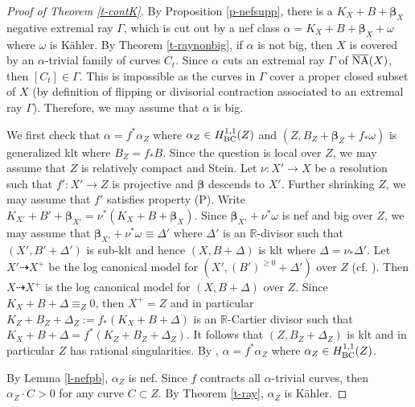 \documentclass[11pt]{amsart}
\numberwithin{equation}{section}
\def\bbeta{\boldsymbol{\beta}}
\newcommand\R{{\mathbb{R}}}
\theoremstyle{definition}
\theoremstyle{definition}
\theoremstyle{definition}
\begin{document}
    \begin{proof}[Proof of Theorem \ref{t-contK}] By Proposition \ref{p-nefsupp}, there is a $K_X+B+\bbeta _X$ negative extremal ray $\Gamma$, which is  cut out by a nef class $\alpha =K_X+B+\bbeta _X+\omega$ where $\omega $ is K\"ahler. By Theorem \ref{t-raynonbig}, if $\alpha$ is not big, then $X$ is covered by an $\alpha$-trivial family of curves $C_t$. Since $\alpha$ cuts an extremal ray $\Gamma$ of $\overline{\rm NA}(X)$, then $[C_t]\in \Gamma$. This is impossible as the curves in $\Gamma$ cover a proper closed subset of $X$ (by definition of flipping or divisorial contraction associated to an extremal ray $\Gamma$). Therefore,  we may assume that $\alpha$ is big. %
    

We first check that $\alpha =f^*\alpha _Z$ where $\alpha_Z\in H^{1,1}_{\rm BC}(Z)$ and $(Z,B_Z+\bbeta _Z+f_*\omega )$ is generalized klt where $B_Z=f_*B$. Since the question is local over $Z$, we may assume that $Z$ is relatively compact and Stein. 
Let $\nu :X'\to X$ be a resolution such that $f':X'\to Z$ is projective and $\bbeta $ descends to $X'$. Further shrinking $Z$, we may assume that $f'$ satisfies property (P). Write $K_{X'}+B'+\bbeta _{X'}=\nu ^*(K_X+B+\bbeta _X)$. Since $\bbeta _{X'}+\nu ^*\omega$ is nef and big over $Z$, we may assume that $\bbeta _{X'}+\nu ^*\omega\equiv \Delta  '$ where $\Delta'$ is an $\R$-divisor such that $(X',B'+\Delta ')$ is sub-klt and hence $(X,B+\Delta) $ is klt where $\Delta =\nu _*\Delta '$.  Let $X'\dasharrow X^+$ be the log canonical model for $(X',(B')^{\geq 0}+\Delta ')$ over $Z$ (cf. \cite{Fuj22}). Then $X\dasharrow X^+$ is the log canonical model for $(X,B+\Delta )$ over $Z$. Since $K_{X}+B+\Delta \equiv _Z0$, then $X^+=Z$ and in particular $K_{Z}+B_Z+\Delta_Z:=f_*(K_{X}+B+\Delta)$ is an $\R$-Cartier divisor such that $K_{X}+B+\Delta=f^*(K_{Z}+B_Z+\Delta_Z)$. It follows that $(Z,B_Z+\Delta _Z)$ is klt and in particular $Z$ has rational singularities. By \cite[Lemma 2.6.(1)]{DH24}, $\alpha =f^*\alpha _Z$
 where $\alpha_Z\in H^{1,1}_{\rm BC}(Z)$.


By Lemma \ref{l-nefpb}, $\alpha _Z$ is nef. Since $f$ contracts all $\alpha$-trivial curves, then $\alpha _Z\cdot C>0 $ for any curve $C\subset Z$. By Theorem \ref{t-ray}, $\alpha _Z$ is K\"ahler.
\end{proof}
\end{document}
